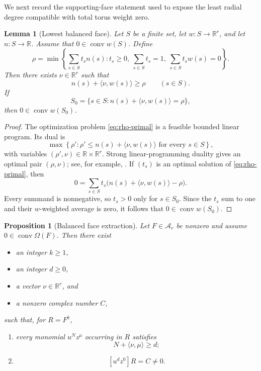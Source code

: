 \documentclass[11pt]{article}
\numberwithin{equation}{section}
\newtheorem{proposition}[theorem]{Proposition}
\newtheorem{lemma}[theorem]{Lemma}
\theoremstyle{definition}
\theoremstyle{remark}
\newcommand{\R}{\mathbb R}
\newcommand{\A}{\mathcal A}
\newcommand{\conv}{\operatorname{conv}}
\begin{document}
We next record the supporting-face statement used to expose the least radial
degree compatible with total torus weight zero.

\begin{lemma}[Lowest balanced face]\label{lem:lowest-face}
Let $S$ be a finite set, let $w:S\to\R^r$, and let $n:S\to\R$.  Assume that
$0\in\conv w(S)$.  Define
\begin{equation}\label{eq:rho-primal}
  \rho=
  \min\left\{
    \sum_{s\in S}t_s n(s):
    t_s\ge0,\ \sum_{s\in S}t_s=1,\
    \sum_{s\in S}t_sw(s)=0
  \right\}.
\end{equation}
Then there exists $\nu\in\R^r$ such that
\begin{equation}\label{eq:supporting-inequality}
  n(s)+\langle\nu,w(s)\rangle\ge\rho
  \qquad(s\in S).
\end{equation}
If
\[
  S_0=\{s\in S:n(s)+\langle\nu,w(s)\rangle=\rho\},
\]
then $0\in\conv w(S_0)$.
\end{lemma}

\begin{proof}
The optimization problem \eqref{eq:rho-primal} is a feasible bounded linear
program.  Its dual is
\[
  \max\left\{\rho':
  \rho'\le n(s)+\langle\nu,w(s)\rangle
  \text{ for every }s\in S\right\},
\]
with variables $(\rho',\nu)\in\R\times\R^r$.  Strong linear-programming
duality gives an optimal pair $(\rho,\nu)$; see, for example,
\cite[Chapter~7]{Schrijver1986}.  If $(t_s)$ is an optimal solution of
\eqref{eq:rho-primal}, then
\[
  0=\sum_{s\in S}t_s
  \bigl(n(s)+\langle\nu,w(s)\rangle-\rho\bigr).
\]
Every summand is nonnegative, so $t_s>0$ only for $s\in S_0$.  Since the
$t_s$ sum to one and their $w$-weighted average is zero, it follows that
$0\in\conv w(S_0)$.
\end{proof}

\begin{proposition}[Balanced face extraction]\label{prop:face-extraction}
Let $F\in\A_r$ be nonzero and assume $0\in\conv\Omega(F)$.  Then there
exist
\begin{itemize}
  \item an integer $k\ge1$,
  \item an integer $d\ge0$,
  \item a vector $\nu\in\R^r$, and
  \item a nonzero complex number $C$,
\end{itemize}
such that, for $R=F^k$,
\begin{enumerate}[label=\textup{(\alph*)}]
  \item every monomial $u^Nz^\mu$ occurring in $R$ satisfies
  \begin{equation}\label{eq:ell-lower-bound}
    N+\langle\nu,\mu\rangle\ge d;
  \end{equation}
  \item
  \begin{equation}\label{eq:distinguished-coefficient}
    [u^dz^0]R=C\ne0.
  \end{equation}
\end{enumerate}
\end{proposition}
\end{document}
